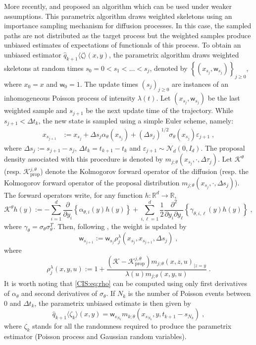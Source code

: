 \documentclass{article}
\newcommand{\parvec}{\theta}
\newcommand{\hdhat}[1]{\widehat{q}_{#1}}
\newcommand{\eqdef}{\ensuremath{:=}}
\newcommand{\eqsp}{\;}
\begin{document}
More recently, \cite{andersson2017unbiased} and \cite{fearnhead2017continuous} proposed an algorithm which can be used under weaker assumptions. 
This parametrix algorithm draws weighted skeletons using an importance sampling mechanism for diffusion processes. 
In this case, the sampled paths are not distributed as the target process but the weighted samples produce unbiased estimates of expectations of functionals of this process. To obtain an unbiased estimator $\hdhat{k+1}\langle \zeta\rangle(x,y)$, the parametrix algorithm draws weighted skeletons at random times $s_0 = 0 < s_1<\dots<s_j $, denoted by $\left\{(x_{s_j},\mathsf{w}_{s_j})\right\}_{j\geqslant 0}$, where $x_0 = x$ and $\mathsf{w}_0=1$. 
The update times $(s_j)_{j\geqslant 0}$ are instances of an inhomogeneous Poisson process of intensity $\lambda(t)$. 
Let $(x_{s_j},\mathsf{w}_{s_j})$ be the last weighted sample and $s_{j+1}$ be the next update time of the trajectory.  While $s_{j+1}<\Delta t_{k}$, the new state is sampled using a simple Euler scheme, namely:
\begin{align*}
x_{s_{j+1}} &\eqdef x_{s_j} + \Delta s_j\alpha_{\parvec}(x_{s_j}) + (\Delta s_j)^{1/2}\sigma_{\parvec}(x_{s_j})\varepsilon_{j+1}\eqsp,
\end{align*}
where $\Delta s_j \eqdef s_{j+1}-s_j$, $\Delta t_{k} = t_{k+1} - t_{k}$ and $\varepsilon_{j+1}\sim\mathcal{N}_d(0,I_d)$. 
The proposal density associated with this procedure is denoted by $m_{j;\parvec}\left(x_{s_j},\cdot,\Delta\tau_j\right)$. 
Let $\mathcal{K}^{\parvec}$ (resp. $\mathcal{K}^{j,\parvec}_{\mathrm{prop}}$) denote the Kolmogorov forward operator of the diffusion  (resp. the Kolmogorov forward operator of the proposal distribution $m_{j;\parvec}\left(x_{s_j},\cdot,\Delta s_j
\right)$). 
The forward operators write, for any function $h:\mathbb{R}^d\rightarrow\mathbb{R}$,
$$
\mathcal{K}^{\theta}h\left(y\right) \eqdef -\sum_{i=1}^d\frac{\partial}{\partial y_i}\left\{\alpha_{\parvec,i}(y)h\left(y\right)\right\} + \sum_{i,\ell=1}^d\frac{1}{2}\frac{\partial^2}{\partial y_i\partial y_\ell}\left\{\gamma_{\parvec,i,\ell}(y)h\left(y\right)\right\}\eqsp,
$$
where $\gamma_\parvec = \sigma_\parvec \sigma_\parvec^T$.
Then, following \cite{fearnhead2017continuous}, the weight is updated by
\[
\mathsf{w}_{s_{j+1}}\eqdef\mathsf{w}_{s_j}\rho^{\lambda}_j\left(x_{s_j},x_{s_{j+1}},\Delta s_j\right)\eqsp,
\]
where
\begin{equation}
\label{CIS:eq:rho}
\rho^{\lambda}_j\left(x,y,u\right)\eqdef 1+\frac{\left(\mathcal{K}-\mathcal{K}^{j,\theta}_{\mathrm{prop}}\right)m_{j;\parvec}\left(x,z,u\right)_{|z=y}}{\lambda(u)m_{j;\parvec}\left(x,y,u\right)}\eqsp.
\end{equation}
It is worth noting that \eqref{CIS:eq:rho} can be computed using only first derivatives of $\alpha_{\parvec}$ and second derivatives of $\sigma_\parvec$. 
If $N_k$ is the number of Poisson events between $0$ and $\Delta t_{k}$, the parametrix unbiased estimate is then given by 
\[
\hdhat{k+1}\langle \zeta_k\rangle(x,y) = \mathsf{w}_{s_{N_k}}m_{k;\parvec}\left(x_{s_{N_k}},y,t_{k+1} - s_{N_k}\right) \eqsp,
\]
where $\zeta_k$ stands for all the randomness required to produce the parametrix estimator (Poisson process and Gaussian random variables).
\end{document}
